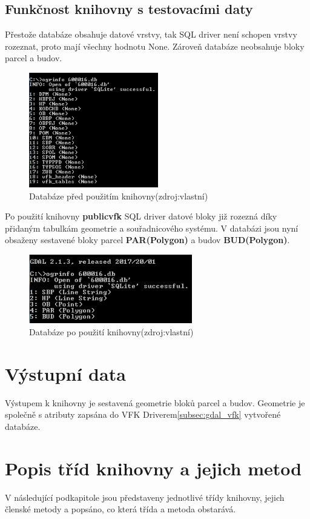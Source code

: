 \subsection{Funkčnost knihovny s testovacími daty}
Přestože databáze obsahuje datové vrstvy, tak SQL driver není schopen vrstvy rozeznat, proto mají všechny hodnotu None. Zároveň databáze neobsahuje bloky parcel a budov.
\begin{figure}[H]
	 \centering
      \includegraphics[height=5cm]{./pictures/funkcnost_knihovny_pred.png}
      \caption{Databáze před použitím knihovny(zdroj:vlastní)}
      \label{fig:funkcnost_pred}
\end{figure}
Po použití knihovny \textbf{publicvfk} SQL driver datové bloky již rozezná díky přidaným tabulkám geometrie a souřadnicového systému. V databázi jsou nyní obsaženy sestavené bloky parcel \textbf{PAR(Polygon)} a budov \textbf{BUD(Polygon)}. 
\begin{figure}[H]
	 \centering
     \includegraphics[height=3cm]{./pictures/funkcnost_knihovny_po.png}
     \caption{Databáze po použití knihovny(zdroj:vlastní)}
     \label{fig:funkcnost_po}
\end{figure}  
  
\section{Výstupní data}
Výstupem k knihovny je sestavená geometrie bloků parcel a budov. Geometrie je společně s atributy zapsána do VFK Driverem\ref{subsec:gdal_vfk} vytvořené databáze.

\section{Popis tříd knihovny a jejich metod}
\label{sec:popis_trid}
V následující podkapitole jsou představeny jednotlivé třídy knihovny, jejich členské metody a popsáno, co která třída a metoda obstarává.

